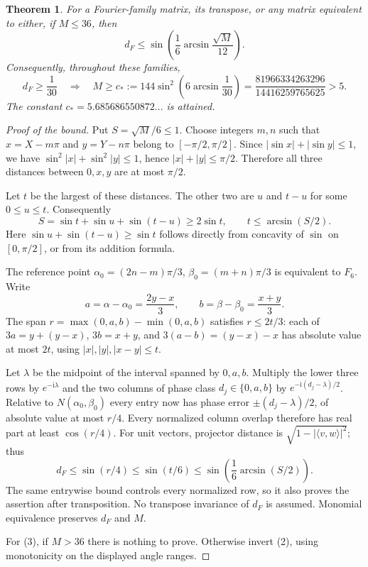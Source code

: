 \documentclass[11pt]{article}
\newtheorem{theorem}{Theorem}
\newcommand{\ii}{\mathrm i}
\begin{document}
\begin{theorem}
For a Fourier-family matrix, its transpose, or any matrix equivalent to
either, if $M\le36$, then
\[
 \boxed{\quad d_F\le
 \sin\!\left(\frac16\arcsin\frac{\sqrt M}{12}\right).\quad} \tag{2}
\]
Consequently, throughout these families,
\[
 d_F\ge\frac1{30}\quad\Longrightarrow\quad
 M\ge c_*:=144\sin^2\!\left(6\arcsin\frac1{30}\right)
 =\frac{81966334263296}{14416259765625}>5.
 \tag{3}
\]
The constant $c_*=5.685686550872\ldots$ is attained.
\end{theorem}

\begin{proof}[Proof of the bound]
Put $S=\sqrt M/6\le1$. Choose integers $m,n$ such that
$x=X-m\pi$ and $y=Y-n\pi$ belong to $[-\pi/2,\pi/2]$.
Since $|\sin x|+|\sin y|\le1$, we have
$\sin^2|x|+\sin^2|y|\le1$, hence $|x|+|y|\le\pi/2$.
Therefore all three distances between $0,x,y$ are at most $\pi/2$.

Let $t$ be the largest of these distances. The other two are $u$ and
$t-u$ for some $0\le u\le t$. Consequently
\[
 S=\sin t+\sin u+\sin(t-u)\ge 2\sin t,
 \qquad t\le\arcsin(S/2). \tag{4}
\]
Here $\sin u+\sin(t-u)\ge\sin t$ follows directly from concavity of
$\sin$ on $[0,\pi/2]$, or from its addition formula.

The reference point
$\alpha_0=(2n-m)\pi/3$, $\beta_0=(m+n)\pi/3$ is equivalent to $F_6$.
Write
\[
 a=\alpha-\alpha_0=\frac{2y-x}{3},\qquad
 b=\beta-\beta_0=\frac{x+y}{3}.
\]
The span $r=\max(0,a,b)-\min(0,a,b)$ satisfies $r\le2t/3$:
each of $3a=y+(y-x)$, $3b=x+y$, and $3(a-b)=(y-x)-x$
has absolute value at most $2t$, using $|x|,|y|,|x-y|\le t$.

Let $\lambda$ be the midpoint of the interval spanned by $0,a,b$.
Multiply the lower three rows by $e^{-\ii\lambda}$ and the two columns
of phase class $d_j\in\{0,a,b\}$ by $e^{-\ii(d_j-\lambda)/2}$.
Relative to $N(\alpha_0,\beta_0)$ every entry now has phase error
$\pm(d_j-\lambda)/2$, of absolute value at most $r/4$.
Every normalized column overlap therefore has real part at least
$\cos(r/4)$. For unit vectors, projector distance is
$\sqrt{1-|\langle v,w\rangle|^2}$; thus
\[
 d_F\le\sin(r/4)\le\sin(t/6)
 \le\sin\!\left(\frac16\arcsin(S/2)\right).
\]
The same entrywise bound controls every normalized row, so it also proves
the assertion after transposition. No transpose invariance of $d_F$ is
assumed. Monomial equivalence preserves $d_F$ and $M$.

For (3), if $M>36$ there is nothing to prove. Otherwise invert (2),
using monotonicity on the displayed angle ranges.
\end{proof}
\end{document}
